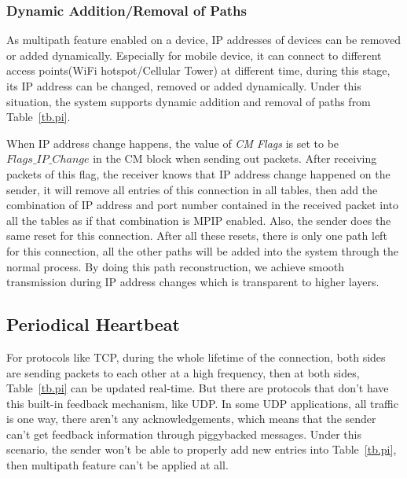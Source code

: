 

\subsubsection{Dynamic Addition/Removal of Paths}
\label{sec:switch}

As multipath feature enabled on a device, IP addresses of devices can be removed or added dynamically. Especially for mobile device, it can connect to different access points(WiFi hotspot/Cellular Tower) at different time, during this stage, its IP address can be changed, removed or added dynamically. Under this situation, the system supports dynamic addition and removal of paths from Table~\ref{tb.pi}.

When IP address change happens, the value of \emph{CM Flags} is set to be $Flags\_IP\_Change$ in the CM block when sending out packets. After receiving packets of this flag, the receiver knows that IP address change happened on the sender, it will remove all entries of this connection in all tables, then add the combination of IP address and port number contained in the received packet into all the tables as if that combination is MPIP enabled.
Also, the sender does the same reset for this connection. After all these resets, there is only one path left for this connection, all the other paths will be added into the system through the normal process. By doing this path reconstruction, we achieve smooth transmission during IP address changes which is transparent to higher layers.


\subsection{Periodical Heartbeat}

For protocols like TCP, during the whole lifetime of the connection, both sides are sending packets to each other at a high frequency, then at both sides, Table~\ref{tb.pi} can be updated real-time. But there are protocols that don't have this built-in feedback mechanism, like UDP. In some UDP applications, all traffic is one way, there aren't any acknowledgements, which means that the sender can't get feedback information through piggybacked messages. Under this scenario, the sender won't be able to properly add new entries into Table~\ref{tb.pi}, then multipath feature can't be applied at all.

